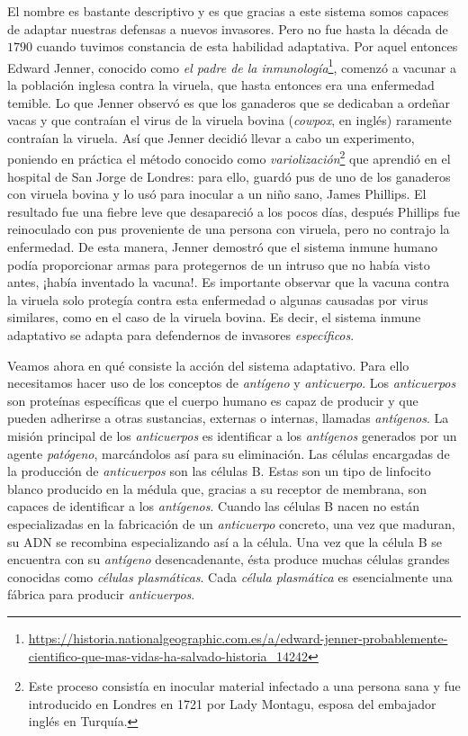 El nombre es bastante descriptivo y es que gracias a este sistema somos capaces de adaptar nuestras defensas a nuevos invasores. Pero no fue hasta la década de $1790$ cuando tuvimos constancia de esta habilidad adaptativa. Por aquel entonces Edward Jenner, conocido como \textit{el padre de la inmunología}\footnote{\url{https://historia.nationalgeographic.com.es/a/edward-jenner-probablemente-cientifico-que-mas-vidas-ha-salvado-historia_14242}}, comenzó a vacunar a la población inglesa contra la viruela, que hasta entonces era una enfermedad temible. Lo que Jenner observó es que los ganaderos que se dedicaban a ordeñar vacas y que contraían el virus de la viruela bovina (\textit{cowpox}, en inglés) raramente contraían la viruela. Así que Jenner decidió llevar a cabo un experimento, poniendo en práctica el método conocido como \textit{variolización}\footnote{Este proceso consistía en inocular material infectado a una persona sana y fue introducido en Londres en 1721 por  Lady Montagu, esposa del embajador inglés en Turquía.} que aprendió en el hospital de San Jorge de Londres: para ello, guardó pus de uno de los ganaderos con viruela bovina y lo usó para inocular a un niño sano, James Phillips. El resultado fue una fiebre leve que desapareció a los pocos días, después Phillips fue reinoculado con pus proveniente de una persona con viruela, pero no contrajo la enfermedad. De esta manera, Jenner demostró que el sistema inmune humano podía proporcionar armas para protegernos de un intruso que no había visto antes, ¡había inventado la vacuna!. Es importante observar que la vacuna contra la viruela solo protegía contra esta enfermedad o algunas causadas por virus similares, como en el caso de la viruela bovina. Es decir, el sistema inmune adaptativo se adapta para defendernos de invasores \textit{específicos}. 

Veamos ahora en qué consiste la acción del sistema adaptativo. Para ello necesitamos hacer uso de los conceptos de \textit{antígeno} y \textit{anticuerpo}. Los \textit{anticuerpos} son proteínas específicas que el cuerpo humano es capaz de producir y que pueden adherirse a otras sustancias, externas o internas, llamadas \textit{antígenos}. La misión principal de los \textit{anticuerpos} es identificar a los \textit{antígenos} generados por un agente \textit{patógeno}, marcándolos así para su eliminación. Las células encargadas de la producción de \textit{anticuerpos} son las células B. Estas son un tipo de linfocito blanco producido en la médula que, gracias a su receptor de membrana, son capaces de identificar a los \textit{antígenos}. Cuando las células B nacen no están especializadas en la fabricación de un \textit{anticuerpo} concreto, una vez que maduran, su ADN se recombina especializando así a la célula. Una vez que la célula B se encuentra con su \textit{antígeno} desencadenante, ésta produce muchas células grandes conocidas como \textit{células plasmáticas}. Cada \textit{célula plasmática} es esencialmente una fábrica para producir \textit{anticuerpos}. %

